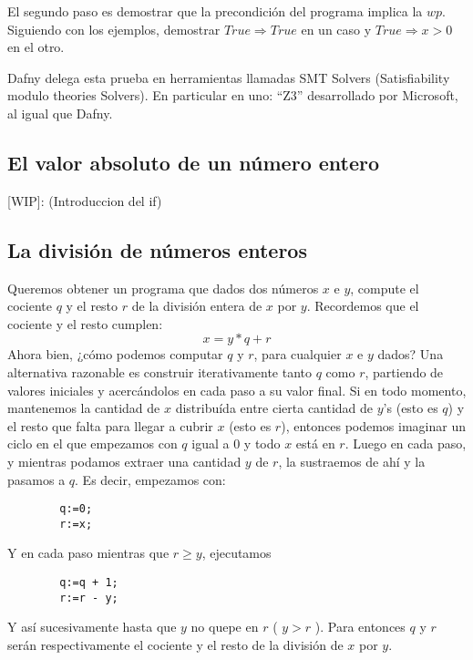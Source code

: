 \documentclass[12pt, a4paper, openany, fleqn]{book}
\begin{document}
    El segundo paso es demostrar que la precondición del programa implica la $wp$.
    Siguiendo con los ejemplos, demostrar $True \Rightarrow True$ en un caso y $True \Rightarrow x > 0$ en el otro.

    Dafny delega esta prueba en herramientas llamadas SMT Solvers (Satisfiability modulo theories Solvers). En particular en uno: ``Z3'' desarrollado por Microsoft, al igual que Dafny.

    \subsection{El valor absoluto de un número entero}
    [WIP]: (Introduccion del if)

    \subsection{La división de números enteros}
    Queremos obtener un programa que dados dos números $x$ e $y$, compute el cociente $q$ y el resto $r$ de la división entera de $x$ por $y$.
    Recordemos que el cociente y el resto cumplen:
    $$x = y * q + r$$
    Ahora bien, ¿cómo podemos computar $q$ y $r$, para cualquier $x$ e $y$ dados?
    Una alternativa razonable es construir iterativamente tanto $q$ como $r$, partiendo de valores iniciales y acercándolos en cada paso a su valor final.
    Si en todo momento, mantenemos la cantidad de $x$ distribuída entre cierta cantidad de $y$’s (esto es $q$) y el resto que falta para llegar a cubrir $x$ (esto es $r$), entonces podemos imaginar un ciclo en el que empezamos con $q$ igual a 0 y todo $x$ está en $r$.
    Luego en cada paso, y mientras podamos extraer una cantidad $y$ de $r$, la sustraemos de ahí y la pasamos a $q$.
    Es decir, empezamos con:
    \begin{verbatim}
        q:=0;
        r:=x;
    \end{verbatim}
    Y en cada paso mientras que $r \geq y$, ejecutamos
    \begin{verbatim}
        q:=q + 1;
        r:=r - y;
    \end{verbatim}

    Y así sucesivamente hasta que $y$ no quepe en $r$ ( $ y > r $ ). Para entonces $q$ y $r$ serán respectivamente el cociente y el resto de la división de $x$ por $y$.
\end{document}
